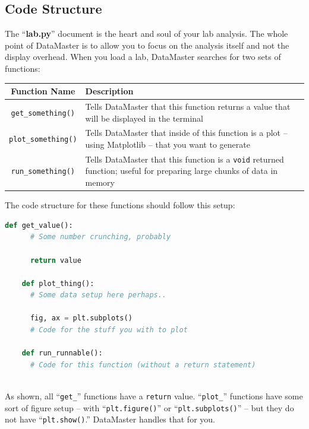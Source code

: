 \documentclass[12pt]{article}
\begin{document}
{\subsection*{Code Structure}
\label{subsec:codestruct}
The ``\textbf{lab.py}'' document is the heart and soul of your lab analysis. The whole point of DataMaster is to allow you to focus on the analysis itself and not the display overhead. When you load a lab, DataMaster searches for two sets of functions:
\begin{framed}
  \centering
  {
  \setlength{\tabcolsep}{14pt}
  \renewcommand{\arraystretch}{2.5}
    \begin{tabular}{ c | m{}}
      Function Name & Description\\\hline
      \texttt{get\_something()} & Tells DataMaster that this function returns a value that will be displayed in the terminal \\
      \texttt{plot\_something()} & Tells DataMaster that inside of this function is a plot -- using Matplotlib -- that you want to generate \\
      \texttt{run\_something()} & Tells DataMaster that this function is a \texttt{void} returned function; useful for preparing large chunks of data in memory
    \end{tabular}
  }
\end{framed}
The code structure for these functions should follow this setup:
\begin{framed}
  \begin{lstlisting}[language=Python]
    def get_value():
      # Some number crunching, probably
      
      return value
    
    def plot_thing():
      # Some data setup here perhaps..
      
      fig, ax = plt.subplots()
      # Code for the stuff you with to plot
    
    def run_runnable():
      # Code for this function (without a return statement)
            
  \end{lstlisting}
\end{framed}
As shown, all ``\texttt{get\_}'' functions have a \texttt{return} value. ``\texttt{plot\_}'' functions have some sort of figure setup -- with ``\texttt{plt.figure()}'' or ``\texttt{plt.subplots()}'' -- but they do not have ``\texttt{plt.show()}.'' DataMaster handles that for you. 

}
\end{document}
